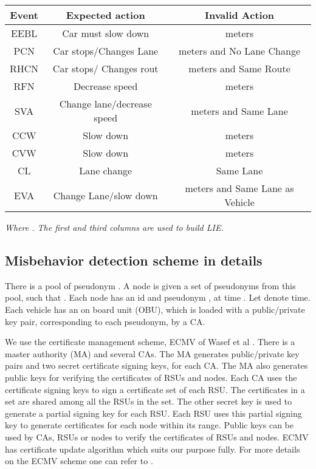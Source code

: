 \documentclass[conference]{IEEEtran}[10pt]
\begin{document}
\begin{table*}[!t]
\begin{center}
\caption{Events and invalid actions}
{\normalsize
\begin{tabular}{|c|c|c|}
\hline
Event & Expected action & Invalid Action\\
\hline
EEBL & Car must slow down &  meters\\
PCN & Car stops/Changes Lane  &  meters and No Lane Change\\
RHCN & Car stops/ Changes rout &  meters and Same Route\\
RFN & Decrease speed &  meters\\
SVA & Change lane/decrease speed &  meters and Same Lane\\
CCW & Slow down &  meters\\
CVW & Slow down &  meters\\
CL & Lane change & Same Lane \\
EVA & Change Lane/slow down &  meters and Same Lane as Vehicle\\
\hline
\end{tabular}
}
\end{center}
\begin{center} {\it Where . The first and third columns are used to build LIE.}\end{center}
\label{table:valid-invalid}
\end{table*}


\subsection{Misbehavior detection scheme in details}
There is a pool of pseudonym . 
A node  is given a set of pseudonyms  from this pool, such that 
. 
Each node  has an id  and pseudonym , at time . Let
  denote time. 
Each vehicle has an on board unit (OBU), 
which is loaded with a public/private key pair, corresponding to each pseudonym,  by a CA.

We use the certificate management scheme, ECMV of Wasef et al \cite{WJS08}. 
There is a master authority (MA) and several CAs. 
The MA generates public/private key pairs and two secret certificate signing keys, for each CA. 
The MA also generates public keys for verifying the certificates of RSUs and nodes. 
Each CA uses the certificate signing keys to sign a certificate set of each RSU. 
The certificates in a set are shared among all the RSUs in the set. 
The other secret key is used to generate  a partial signing key for each RSU. 
Each RSU uses this partial signing key to generate certificates for each node within its range. 
Public keys can be used by CAs, RSUs or nodes to verify the certificates of RSUs and nodes. 
ECMV has certificate update algorithm which suits our purpose fully. 
For more details on the ECMV scheme one can refer to \cite{WJS08}. 
\end{document}
